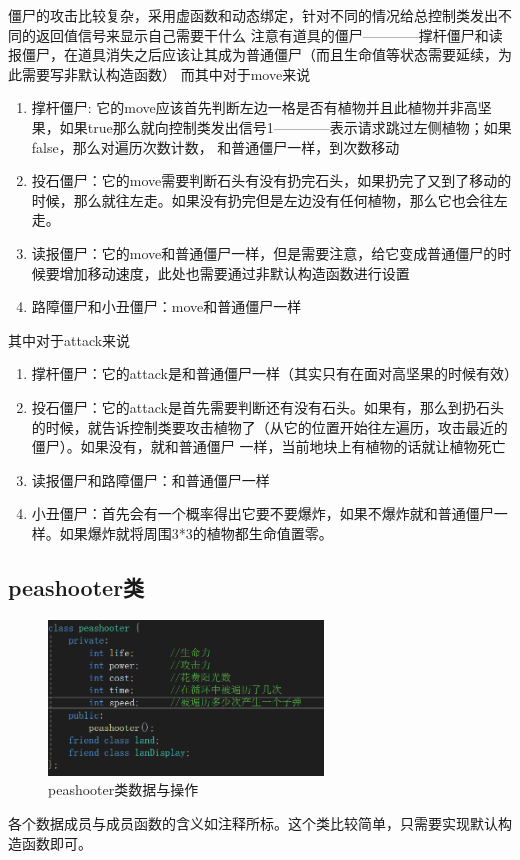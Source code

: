 \documentclass[12pt,a4paper,UTF8]{article}
\begin{document}
      僵尸的攻击比较复杂，采用虚函数和动态绑定，针对不同的情况给总控制类发出不同的返回值信号来显示自己需要干什么
      注意有道具的僵尸————撑杆僵尸和读报僵尸，在道具消失之后应该让其成为普通僵尸（而且生命值等状态需要延续，为此需要写非默认构造函数）
      而其中对于move来说
      \begin{enumerate}
        \item 撑杆僵尸: 它的move应该首先判断左边一格是否有植物并且此植物并非高坚果，如果true那么就向控制类发出信号1————表示请求跳过左侧植物；如果false，那么对遍历次数计数，
        和普通僵尸一样，到次数移动
        \item 投石僵尸：它的move需要判断石头有没有扔完石头，如果扔完了又到了移动的时候，那么就往左走。如果没有扔完但是左边没有任何植物，那么它也会往左走。
        \item 读报僵尸：它的move和普通僵尸一样，但是需要注意，给它变成普通僵尸的时候要增加移动速度，此处也需要通过非默认构造函数进行设置
        \item 路障僵尸和小丑僵尸：move和普通僵尸一样
      \end{enumerate}
      其中对于attack来说
      \begin{enumerate}
        \item 撑杆僵尸：它的attack是和普通僵尸一样（其实只有在面对高坚果的时候有效）
        \item 投石僵尸：它的attack是首先需要判断还有没有石头。如果有，那么到扔石头的时候，就告诉控制类要攻击植物了（从它的位置开始往左遍历，攻击最近的僵尸）。如果没有，就和普通僵尸
        一样，当前地块上有植物的话就让植物死亡
        \item 读报僵尸和路障僵尸：和普通僵尸一样
        \item 小丑僵尸：首先会有一个概率得出它要不要爆炸，如果不爆炸就和普通僵尸一样。如果爆炸就将周围3*3的植物都生命值置零。
      \end{enumerate}


    \subsection{peashooter类}
      \begin{figure}[H]
        \centering
      \includegraphics[width=0.65\textwidth]{figure/pea.png}
      \caption{peashooter类数据与操作}
      \end{figure}
      各个数据成员与成员函数的含义如注释所标。这个类比较简单，只需要实现默认构造函数即可。
\end{document}
